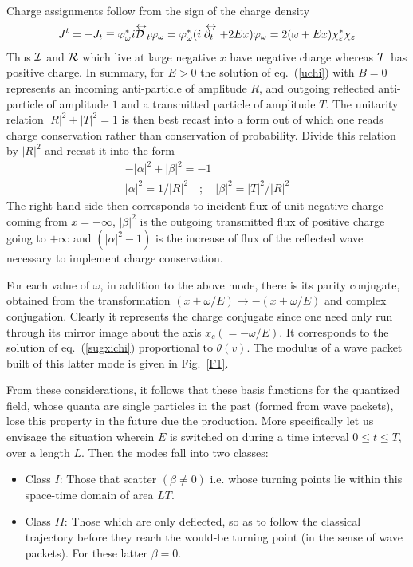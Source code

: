 \documentclass[12pt,oneside]{report}
\def\lrD{\mathrel{{\cal D}\kern-.75em\raise1.75ex\hbox{$\leftrightarrow$}}}
\def\lr #1{\mathrel{#1\kern-.75em\raise1.75ex\hbox{$\leftrightarrow$}}}
\begin{document}
\par Charge assignments follow from the sign of the charge density
 \begin{eqnarray}
J^t=-
J_t\equiv \varphi^*_{\omega} i {\lrD_t} \varphi_{\omega}=
\varphi^*_{\omega}(i \lr {\partial_t} +2 E x)\varphi_{\omega}=
2(\omega +Ex)\chi_{\varepsilon}^*\chi_{\varepsilon}
\label{jt}
\end{eqnarray}
  Thus
${\cal I}$ and ${\cal R}$ which live at large negative $x$ have negative
charge
whereas ${\cal T}$ has positive charge.   
In summary, for $E > 0$ the 
solution of eq.~(\ref{uchi}) with $B=0$ represents
an incoming anti-particle of amplitude $R$, and
outgoing reflected anti-particle of amplitude $1$ 
and a transmitted particle of amplitude $T$.   The
unitarity relation $|R|^2 + |T|^2 = 1$ is then best recast into
a form out of which one reads charge conservation rather than
conservation of probability.  Divide this relation by $|R|^2$ and recast
it into the form
\begin{eqnarray}
 &-|\alpha|^2 + |\beta|^2 = -1 \label{unitarity}& \nonumber\\
 &|\alpha|^2 = 1/|R|^2 \quad; \quad |\beta|^2 =
|T|^2/|R|^2 &\label{coefbog}
\end{eqnarray}
The right hand side then corresponds to incident flux of
unit negative charge coming from $x=-\infty$, $|\beta|^2$ is the outgoing 
 transmitted flux of
positive charge going to $+\infty$ and $(|\alpha|^2 - 1)$ is the increase of
flux of the reflected wave necessary to implement charge
conservation.
\par For each value of $\omega$, in addition to the above mode, there is
its parity conjugate, obtained from the transformation $(x+\omega /E)\to
-(x+\omega /E)$ and complex conjugation.
Clearly it represents the charge conjugate since one need only run through
its mirror image about the 
axis $x_c (=- \omega/E)$. It corresponds to the solution
of eq.~(\ref{sugxichi}) proportional to $\theta (v)$.
The modulus of a wave packet built of this latter mode 
is given in Fig.~\ref{F1}.
\par From these considerations, it follows that these basis functions for the
quantized 
field, whose quanta are single particles in the past (formed from wave packets),
lose this property in the future due the production. More  specifically let us
envisage the situation wherein $E$ is switched on during a time interval $0\leq
t\leq T$, over
a length $L$. Then the modes fall into two classes:
\begin{itemize}
\item{Class $I$:} Those that scatter $(\beta \neq 0)$ i.e. whose turning
points lie
within this space-time domain of area $LT$.
\item{Class $II$:} Those which are only deflected, so as to follow the
classical trajectory
before they reach the would-be turning point (in the sense of wave
packets). For these latter
$\beta =0$.
\end {itemize}
\end{document}
